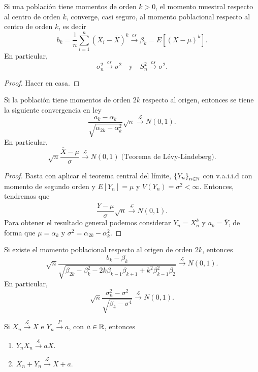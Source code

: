 \begin{prop}
Si una población tiene momentos de orden $\displaystyle k > 0 $, el momento muestral respecto al centro de orden $\displaystyle k $, converge, casi seguro, al momento poblacional respecto al centro de orden $\displaystyle k $, es decir
\[b_{k}=\frac{1}{n}\sum^{n}_{i=1}\left(X_{i}-\overline{X}\right)^{k}\xrightarrow{cs}\beta_{k}=E\left[\left(X-\mu\right)^{k}\right]  .\]
En particular, 
\[\sigma_{n}^{2}\xrightarrow{cs}\sigma^{2} \quad \text{y} \quad S_{n}^{2} \xrightarrow{cs} \sigma^{2} .\]
\end{prop}
\begin{proof}
Hacer en casa.
\end{proof}
\begin{prop}
Si la población tiene momentos de orden $\displaystyle 2k $ respecto al origen, entonces se tiene la siguiente convergencia en ley
\[\frac{a_{k}-\alpha_{k}}{\sqrt{\alpha_{2k}-\alpha ^{2}_{k}}}\sqrt{n}\xrightarrow{\mathcal{L}} N\left(0,1\right) .\]
En particular, 
\[\sqrt{n}\frac{\overline{X}-\mu}{\sigma }\xrightarrow{\mathcal{L}} N\left(0,1\right) \; \text{(Teorema de Lévy-Lindeberg)}.\]
\end{prop}
\begin{proof}
	Basta con aplicar el teorema central del límite, $\displaystyle \left\{ Y_{n}\right\} _{n\in\mathbb{N}} $ con v.a.i.i.d con momento de segundo orden y $\displaystyle E\left[Y_{n}\right] =\mu $ y $\displaystyle V\left(Y_{n}\right)=\sigma^{2}< \infty $. Entonces, tendremos que
	\[\frac{\overline{Y}-\mu}{\sigma }\sqrt{n} \xrightarrow{\mathcal{L}} N\left(0,1\right) .\]
	Para obtener el resultado general podemos considerar $\displaystyle Y_{n}=X^{k}_{n} $ y $\displaystyle a_{k}=\overline{Y} $, de forma que $\displaystyle \mu = \alpha_{k} $ y $\displaystyle \sigma^{2}=\alpha_{2k}-\alpha_{k}^{2} $.
\end{proof}
\begin{prop}
Si existe el momento poblacional respecto al origen de orden $\displaystyle 2k $, entonces
\[\sqrt{n}\frac{b_{k}-\beta_{k}}{\sqrt{ \beta_{2k}-\beta_{k}^{2} - 2k\beta_{k-1}\beta_{k+1}+k^{2}\beta_{k-1}^{2}\beta_{2}}} \xrightarrow{\mathcal{L}} N\left(0,1\right).\]
En particular, 
\[\sqrt{n}\frac{\sigma^{2}_{n}-\sigma^{2}}{\sqrt{\beta_{4}-\sigma^{4}}}\xrightarrow{\mathcal{L}} N\left(0,1\right) .\]
\end{prop}
\begin{theorem}
Si $\displaystyle X_{n}\xrightarrow{\mathcal{L}} X$ e $\displaystyle Y_{n}\xrightarrow{P}a $, con $\displaystyle a \in \mathbb{R} $, entonces
\begin{enumerate}
\item $\displaystyle Y_{n}X_{n}\xrightarrow{\mathcal{L}}aX $.
\item $\displaystyle X_{n} + Y_{n} \xrightarrow{\mathcal{L}} X + a $.
\end{enumerate}
\end{theorem}
